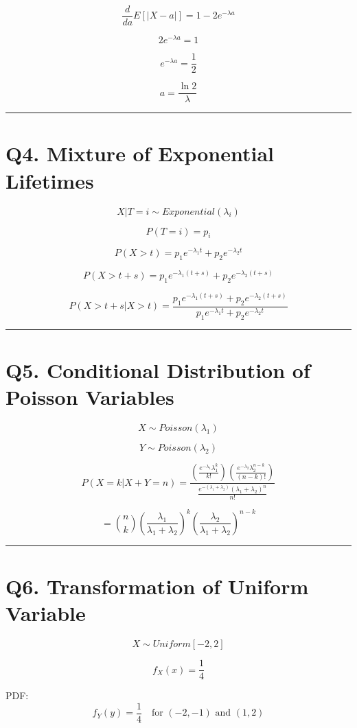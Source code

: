 \documentclass[12pt]{article}
\begin{document}
\[
\frac{d}{da}E[|X-a|]
=
1-2e^{-\lambda a}
\]

\[
2e^{-\lambda a}=1
\]

\[
e^{-\lambda a}=\frac12
\]

\[
a=\frac{\ln2}{\lambda}
\]

\hrule
\vspace{1em}

\section*{Q4. Mixture of Exponential Lifetimes}

\[
X|T=i\sim Exponential(\lambda_i)
\]

\[
P(T=i)=p_i
\]

\[
P(X>t)
=
p_1 e^{-\lambda_1 t}
+
p_2 e^{-\lambda_2 t}
\]

\[
P(X>t+s)
=
p_1 e^{-\lambda_1(t+s)}
+
p_2 e^{-\lambda_2(t+s)}
\]

\[
P(X>t+s|X>t)
=
\frac{
p_1 e^{-\lambda_1(t+s)}
+
p_2 e^{-\lambda_2(t+s)}
}
{
p_1 e^{-\lambda_1 t}
+
p_2 e^{-\lambda_2 t}
}
\]

\hrule
\vspace{1em}

\section*{Q5. Conditional Distribution of Poisson Variables}

\[
X\sim Poisson(\lambda_1)
\]

\[
Y\sim Poisson(\lambda_2)
\]

\[
P(X=k|X+Y=n)
=
\frac{
\left(\frac{e^{-\lambda_1}\lambda_1^k}{k!}\right)
\left(\frac{e^{-\lambda_2}\lambda_2^{n-k}}{(n-k)!}\right)
}
{
\frac{e^{-(\lambda_1+\lambda_2)}(\lambda_1+\lambda_2)^n}{n!}
}
\]

\[
=
\binom{n}{k}
\left(\frac{\lambda_1}{\lambda_1+\lambda_2}\right)^k
\left(\frac{\lambda_2}{\lambda_1+\lambda_2}\right)^{n-k}
\]

\hrule
\vspace{1em}

\section*{Q6. Transformation of Uniform Variable}

\[
X\sim Uniform[-2,2]
\]

\[
f_X(x)=\frac14
\]

PDF:
\[
f_Y(y)=\frac14 \quad \text{for } (-2,-1)\text{ and }(1,2)
\]
\end{document}

